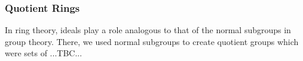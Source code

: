 


\subsubsection{Quotient Rings}
In ring theory, ideals play a role analogous to that of the normal subgroups in group theory. There, we used normal subgroups to create quotient groups which were sets of ...TBC...



%
%
%
%
%
%




